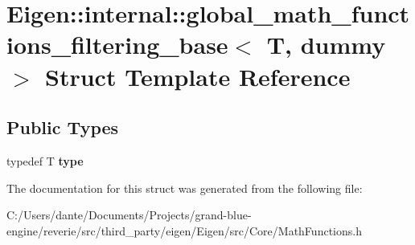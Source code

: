 \hypertarget{struct_eigen_1_1internal_1_1global__math__functions__filtering__base}{}\section{Eigen\+::internal\+::global\+\_\+math\+\_\+functions\+\_\+filtering\+\_\+base$<$ T, dummy $>$ Struct Template Reference}
\label{struct_eigen_1_1internal_1_1global__math__functions__filtering__base}
\subsection*{Public Types}
\begin{DoxyCompactItemize}
\item 
\mbox{\label{struct_eigen_1_1internal_1_1global__math__functions__filtering__base_a22afb2cecb676986edeaa1958548a85a}} 
typedef T {\bfseries type}
\end{DoxyCompactItemize}


The documentation for this struct was generated from the following file\+:\begin{DoxyCompactItemize}
\item 
C\+:/\+Users/dante/\+Documents/\+Projects/grand-\/blue-\/engine/reverie/src/third\+\_\+party/eigen/\+Eigen/src/\+Core/Math\+Functions.\+h\end{DoxyCompactItemize}
